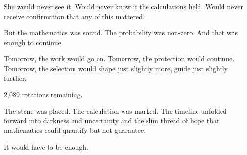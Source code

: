 She would never see it. Would never know if the calculations held. Would never receive confirmation that any of this mattered.

But the mathematics was sound. The probability was non-zero. And that was enough to continue.

Tomorrow, the work would go on. Tomorrow, the protection would continue. Tomorrow, the selection would shape just slightly more, guide just slightly further.

2,089 rotations remaining.

The stone was placed. The calculation was marked. The timeline unfolded forward into darkness and uncertainty and the slim thread of hope that mathematics could quantify but not guarantee.

It would have to be enough.

